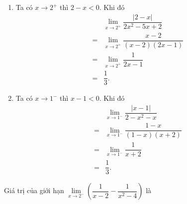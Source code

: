 \begin{ex}
{\begin{enumerate}
\begin{eqnarray*}
				 &=&\displaystyle\lim_{x \to \left(-4\right)^-} \dfrac{\sqrt{(-x-4)(-x+4)}}{-(x+4)}\\
				 &=&\displaystyle\lim_{x \to \left(-4\right)^-} \dfrac{\sqrt{-x+4}}{\sqrt{-x-4}}\\
				 &=&+\infty.
			\end{eqnarray*}
			 Vì
			\begin{itemize}
				\item $\displaystyle\lim_{x  \to \left(-4\right)^-}\sqrt{-x+4}=2\sqrt{2}$.
				\item $\displaystyle\lim_{x\to \left(-4\right)^-}\sqrt{-x-4}=0$  và $-x-4>0$.
			\end{itemize}
			\item Ta có $x  \to 2^+$ thì $2-x<0$. Khi đó
			\begin{eqnarray*}
				&&\displaystyle\lim_{x \to 2^+}  \dfrac{\left|2-x\right|}{2x^2-5x+2}\\
				&=&\displaystyle\lim_{x \to 2^+}  \dfrac{x-2}{(x-2)(2x-1)}\\
				&=&\displaystyle\lim_{x \to  2^+} \dfrac{1}{2x-1}\\
				 &=&\dfrac{1}{3}.
			\end{eqnarray*}
			\item Ta có $x  \to 1^-$ thì $x-1<0$. Khi đó
			\begin{eqnarray*}
				&&\displaystyle\lim_{x \to  1^-} \dfrac{\left|x-1\right|}{2-x^2-x}\\
				 &=&\displaystyle\lim_{x \to 1^-} \dfrac{1-x}{(1-x)(x+2)}\\
				&=&\displaystyle\lim_{x \to 1^-}  \dfrac{1}{x+2}\\
				&=&\dfrac{1}{3}. 
			\end{eqnarray*}
		\end{enumerate}
	} 
\end{ex}

\begin{ex}%
	Giá trị của giới hạn $\lim\limits_{x\to  2^-}\left(\dfrac{1}{x-2}-\dfrac{1}{x^2-4}\right)$ là
\end{ex}

